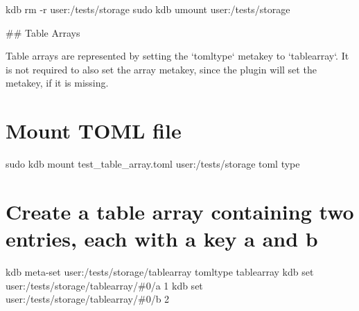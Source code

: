 kdb rm -\/r user\+:/tests/storage sudo kdb umount user\+:/tests/storage 
\begin{DoxyCode}
## Table Arrays

Table arrays are represented by setting the `tomltype` metakey to `tablearray`. It is not required to also
       set the array metakey, since the plugin will set the metakey, if it is missing.
\end{DoxyCode}
 \hypertarget{autotoc_md635_autotoc_md706}{}\section{Mount T\+O\+M\+L file}\label{autotoc_md635_autotoc_md706}
sudo kdb mount test\+\_\+table\+\_\+array.\+toml user\+:/tests/storage toml type\hypertarget{autotoc_md635_autotoc_md707}{}\section{Create a table array containing two entries, each with a key \textquotesingle{}a\textquotesingle{} and \textquotesingle{}b\textquotesingle{}}\label{autotoc_md635_autotoc_md707}
kdb meta-\/set \textquotesingle{}user\+:/tests/storage/tablearray\textquotesingle{} \textquotesingle{}tomltype\textquotesingle{} \textquotesingle{}tablearray\textquotesingle{} kdb set \textquotesingle{}user\+:/tests/storage/tablearray/\#0/a\textquotesingle{} \textquotesingle{}1\textquotesingle{} kdb set \textquotesingle{}user\+:/tests/storage/tablearray/\#0/b\textquotesingle{} \textquotesingle{}2\textquotesingle{}

